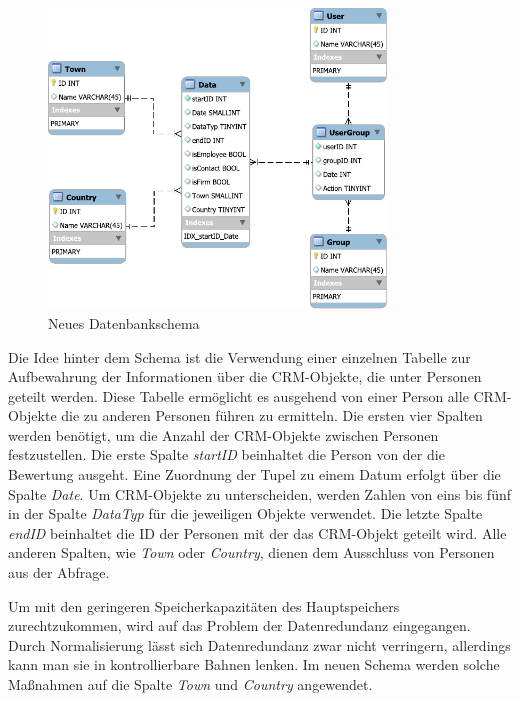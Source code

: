 \begin{figure}[htbp]
\centering
  \includegraphics[width=0.8\textwidth, width=0.8\textwidth]{pics/NewSchema.pdf}
\caption{Neues Datenbankschema}
\label{konzept_SchemaNeu}
\end{figure} 

Die Idee hinter dem Schema ist die Verwendung einer einzelnen Tabelle zur Aufbewahrung der Informationen über die CRM-Objekte, die unter Personen geteilt werden. Diese Tabelle ermöglicht es ausgehend von einer Person alle CRM-Objekte die zu anderen Personen führen zu ermitteln. Die ersten vier Spalten werden benötigt, um die Anzahl der CRM-Objekte zwischen Personen festzustellen. Die erste Spalte \textit{startID} beinhaltet die Person von der die Bewertung ausgeht. Eine Zuordnung der Tupel zu einem Datum erfolgt über die Spalte \textit{Date}. Um CRM-Objekte zu unterscheiden, werden Zahlen von eins bis fünf in der Spalte \textit{DataTyp} für die jeweiligen Objekte verwendet. Die letzte Spalte \textit{endID} beinhaltet die ID der Personen mit der das CRM-Objekt geteilt wird. Alle anderen Spalten, wie \textit{Town} oder \textit{Country}, dienen dem Ausschluss von Personen aus der Abfrage.

Um mit den geringeren Speicherkapazitäten des Hauptspeichers zurechtzukommen, wird auf das Problem der Datenredundanz eingegangen. Durch Normalisierung lässt sich Datenredundanz zwar nicht verringern, allerdings kann man sie in kontrollierbare Bahnen lenken. Im neuen Schema werden solche Maßnahmen auf die Spalte \textit{Town} und \textit{Country} angewendet. 

